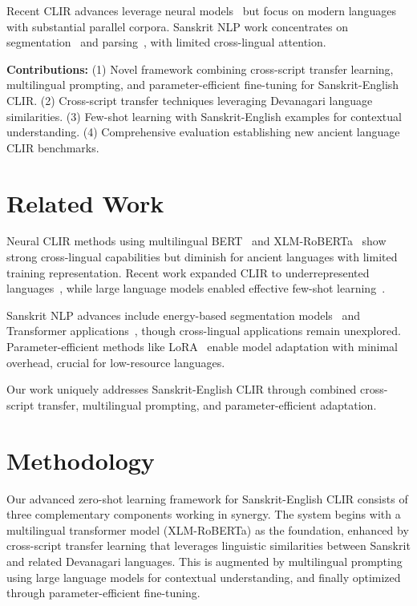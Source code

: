 \documentclass[runningheads]{llncs}
\begin{document}
Recent CLIR advances leverage neural models~\cite{jiang2020bert,ogundepo2022africlir} but focus on modern languages with substantial parallel corpora. Sanskrit NLP work concentrates on segmentation~\cite{krishna2021energy} and parsing~\cite{sandhan2022transformers}, with limited cross-lingual attention.

\textbf{Contributions:} (1) Novel framework combining cross-script transfer learning, multilingual prompting, and parameter-efficient fine-tuning for Sanskrit-English CLIR. (2) Cross-script transfer techniques leveraging Devanagari language similarities. (3) Few-shot learning with Sanskrit-English examples for contextual understanding. (4) Comprehensive evaluation establishing new ancient language CLIR benchmarks.

\section{Related Work}
\label{sec:related}

Neural CLIR methods using multilingual BERT~\cite{devlin2019bert} and XLM-RoBERTa~\cite{conneau2020unsupervised} show strong cross-lingual capabilities but diminish for ancient languages with limited training representation. Recent work expanded CLIR to underrepresented languages~\cite{ogundepo2022africlir}, while large language models enabled effective few-shot learning~\cite{brown2020language}.

Sanskrit NLP advances include energy-based segmentation models~\cite{krishna2021energy} and Transformer applications~\cite{sandhan2022transformers}, though cross-lingual applications remain unexplored. Parameter-efficient methods like LoRA~\cite{hu2021lora} enable model adaptation with minimal overhead, crucial for low-resource languages.

Our work uniquely addresses Sanskrit-English CLIR through combined cross-script transfer, multilingual prompting, and parameter-efficient adaptation.

\section{Methodology}
\label{sec:methodology}

Our advanced zero-shot learning framework for Sanskrit-English CLIR consists of three complementary components working in synergy. The system begins with a multilingual transformer model (XLM-RoBERTa) as the foundation, enhanced by cross-script transfer learning that leverages linguistic similarities between Sanskrit and related Devanagari languages. This is augmented by multilingual prompting using large language models for contextual understanding, and finally optimized through parameter-efficient fine-tuning.
\end{document}

